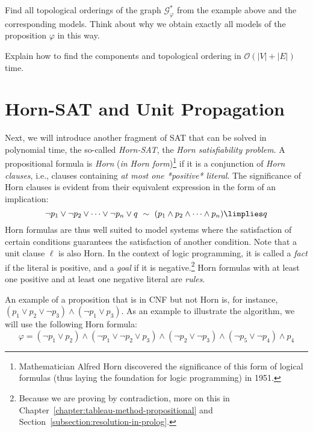 \begin{exercise}
    Find all topological orderings of the graph $\mathcal{G}_\varphi^\ast$ from the example above and the corresponding models. Think about why we obtain exactly all models of the proposition $\varphi$ in this way.
\end{exercise}

\begin{exercise}
    Explain how to find the components and topological ordering in $\mathcal{O}(|V| + |E|)$ time.
\end{exercise}


\section{Horn-SAT and Unit Propagation}\label{section:horn-sat}

Next, we will introduce another fragment of SAT that can be solved in polynomial time, the so-called \emph{Horn-SAT}, the \emph{Horn satisfiability problem}. A propositional formula is \emph{Horn} (\emph{in Horn form})\footnote{Mathematician Alfred Horn discovered the significance of this form of logical formulas (thus laying the foundation for logic programming) in 1951.} if it is a conjunction of \emph{Horn clauses}, i.e., clauses containing \emph{at most one *positive* literal}. The significance of Horn clauses is evident from their equivalent expression in the form of an implication:
$$
\neg p_1\lor \neg p_2\lor \dots \lor \neg p_n\lor q\ \sim\ (p_1\land p_2\land\dots \land p_n)\limplies q
$$
Horn formulas are thus well suited to model systems where the satisfaction of certain conditions guarantees the satisfaction of another condition. Note that a unit clause $\ell$ is also Horn. In the context of logic programming, it is called a \emph{fact} if the literal is positive, and a \emph{goal} if it is negative.\footnote{Because we are proving by contradiction, more on this in Chapter~\ref{chapter:tableau-method-propositional} and Section~\ref{subsection:resolution-in-prolog}.} Horn formulas with at least one positive and at least one negative literal are \emph{rules}.

\begin{example}
    An example of a proposition that is in CNF but not Horn is, for instance, $(p_1\lor p_2\lor\neg p_3)\land (\neg p_1\lor p_3)$. As an example to illustrate the algorithm, we will use the following Horn formula:
    $$
    \varphi=(\neg p_1\lor p_2)\land(\neg p_1\lor\neg p_2\lor p_3)\land(\neg p_2\lor\neg p_3)\land(\neg p_5\lor \neg p_4)\land p_4
    $$
\end{example}

